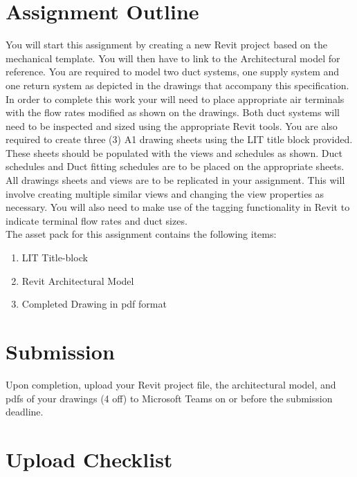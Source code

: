 \vspace{1cm}




\section*{Assignment Outline}
You will start this assignment by creating a new Revit project based on the mechanical template.  You will then have to link to the Architectural model for reference.  You are required to model two duct systems, one supply system and one return system as depicted in the drawings that accompany this specification. In order to complete this work your will need to place appropriate air terminals with the flow rates modified as shown on the drawings. Both duct systems will need to be inspected and sized using the appropriate Revit tools. You are also required to create three (3) A1 drawing sheets using the LIT title block provided. These sheets should be populated with the views and schedules as shown.  Duct schedules and Duct fitting schedules are to be placed on the appropriate sheets. All drawings sheets and views are to be replicated in your assignment. This will involve creating multiple similar views and changing the view properties as necessary. You will also need to make use of the tagging functionality in Revit to indicate terminal flow rates and duct sizes.\\


The asset pack for this assignment contains the following items:
\begin{enumerate}
	\item LIT Title-block
	\item Revit Architectural Model
	\item Completed Drawing in pdf format
\end{enumerate}


\section*{Submission}
Upon completion, upload your Revit project file, the architectural model, and pdfs of your drawings (4 off) to Microsoft Teams on or before the submission deadline.

\section*{Upload Checklist}

